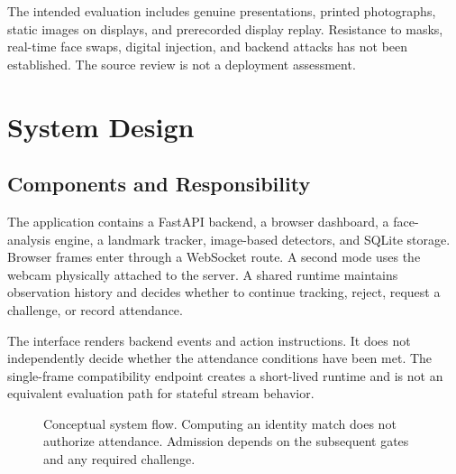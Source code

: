 \documentclass[conference,a4paper]{IEEEtran}
\begin{document}
The intended evaluation includes genuine presentations, printed photographs, static images on displays, and prerecorded display replay. Resistance to masks, real-time face swaps, digital injection, and backend attacks has not been established. The source review is not a deployment assessment.

\section{System Design}
\subsection{Components and Responsibility}
The application contains a FastAPI backend, a browser dashboard, a face-analysis engine, a landmark tracker, image-based detectors, and SQLite storage. Browser frames enter through a WebSocket route. A second mode uses the webcam physically attached to the server. A shared runtime maintains observation history and decides whether to continue tracking, reject, request a challenge, or record attendance.

The interface renders backend events and action instructions. It does not independently decide whether the attendance conditions have been met. The single-frame compatibility endpoint creates a short-lived runtime and is not an equivalent evaluation path for stateful stream behavior.

\begin{figure}[t]
\centering
{}
\caption{Conceptual system flow. Computing an identity match does not authorize attendance. Admission depends on the subsequent gates and any required challenge.}
\label{fig:system}
\end{figure}
\end{document}
